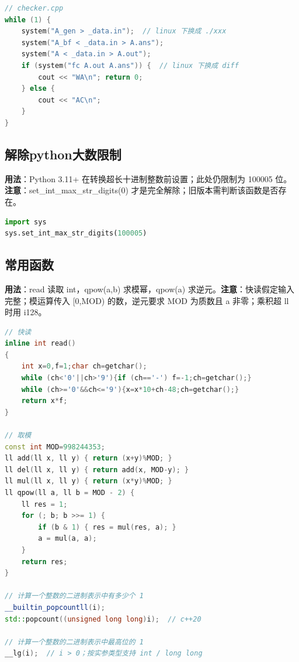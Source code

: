 \documentclass[a4paper,9pt]{extarticle}
\begin{document}
\begin{lstlisting}[language={C++}]
// checker.cpp
while (1) {
	system("A_gen > _data.in");  // linux 下换成 ./xxx
	system("A_bf < _data.in > A.ans");
	system("A < _data.in > A.out");
	if (system("fc A.out A.ans")) {  // linux 下换成 diff
		cout << "WA\n"; return 0;
	} else {
		cout << "AC\n";
	}
}
\end{lstlisting}

\subsection{解除python大数限制}

\textbf{用法}：Python 3.11+ 在转换超长十进制整数前设置；此处仍限制为 100005 位。\textbf{注意}：set\_\allowbreak{}int\_\allowbreak{}max\_\allowbreak{}str\_\allowbreak{}digits(\allowbreak{}0) 才是完全解除；旧版本需判断该函数是否存在。

\begin{lstlisting}[language={Python}]
import sys
sys.set_int_max_str_digits(100005)
\end{lstlisting}

\subsection{常用函数}

\textbf{用法}：read 读取 int，qpow(\allowbreak{}a,\allowbreak{}b) 求模幂，qpow(a) 求逆元。\textbf{注意}：快读假定输入完整；模运算传入 [0,MOD) 的数，逆元要求 MOD 为质数且 a 非零；乘积超 ll 时用 i128。

\begin{lstlisting}[language={C++}]
// 快读
inline int read()
{
	int x=0,f=1;char ch=getchar();
	while (ch<'0'||ch>'9'){if (ch=='-') f=-1;ch=getchar();}
	while (ch>='0'&&ch<='9'){x=x*10+ch-48;ch=getchar();}
	return x*f;
}

// 取模
const int MOD=998244353;
ll add(ll x, ll y) { return (x+y)%MOD; }
ll del(ll x, ll y) { return add(x, MOD-y); }
ll mul(ll x, ll y) { return (x*y)%MOD; }
ll qpow(ll a, ll b = MOD - 2) {
	ll res = 1;
	for (; b; b >>= 1) {
		if (b & 1) { res = mul(res, a); }
		a = mul(a, a);
	}
	return res;
}

// 计算一个整数的二进制表示中有多少个 1
__builtin_popcountll(i);
std::popcount((unsigned long long)i);  // c++20

// 计算一个整数的二进制表示中最高位的 1
__lg(i);  // i > 0；按实参类型支持 int / long long
\end{lstlisting}
\end{document}
